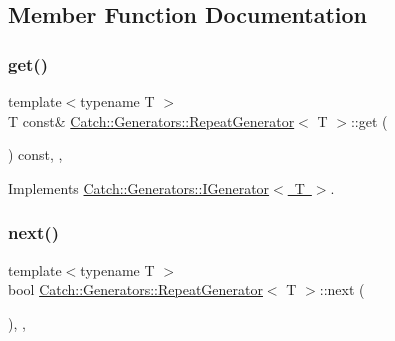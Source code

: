 \subsection{Member Function Documentation}
\mbox{\label{class_catch_1_1_generators_1_1_repeat_generator_a43bd573274c9a0cd7f4406a3d0d36d49}} 
\subsubsection{\texorpdfstring{get()}{get()}}
{\footnotesize\ttfamily template$<$typename T $>$ \\
T const\& \mbox{\hyperlink{class_catch_1_1_generators_1_1_repeat_generator}{Catch\+::\+Generators\+::\+Repeat\+Generator}}$<$ T $>$\+::get (\begin{DoxyParamCaption}{ }\end{DoxyParamCaption}) const\hspace{0.3cm}{\ttfamily [inline]}, {\ttfamily [override]}, {\ttfamily [virtual]}}



Implements \mbox{\hyperlink{struct_catch_1_1_generators_1_1_i_generator_a525d381fc9249a885b075a0632a8579a}{Catch\+::\+Generators\+::\+I\+Generator$<$ T $>$}}.

\mbox{\label{class_catch_1_1_generators_1_1_repeat_generator_a24d5c2b1c09d6d220d4bd4c83f222dcb}} 
\subsubsection{\texorpdfstring{next()}{next()}}
{\footnotesize\ttfamily template$<$typename T $>$ \\
bool \mbox{\hyperlink{class_catch_1_1_generators_1_1_repeat_generator}{Catch\+::\+Generators\+::\+Repeat\+Generator}}$<$ T $>$\+::next (\begin{DoxyParamCaption}{ }\end{DoxyParamCaption})\hspace{0.3cm}{\ttfamily [inline]}, {\ttfamily [override]}, {\ttfamily [virtual]}}




